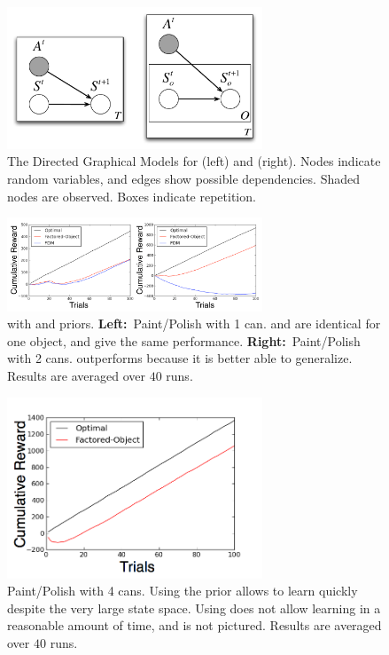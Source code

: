 \begin{figure}
\vskip 0.2in
\begin{center}
\centerline{\includegraphics[width=3in]{dgms}}
\caption{
The Directed Graphical Models for  (left) and  (right). Nodes indicate random variables, and edges show possible dependencies. Shaded nodes are observed. Boxes indicate repetition.
}
\label{fig:dgms}
\end{center}
\vskip -0.2in
\end{figure} 

\begin{figure}
\vskip 0.2in
\begin{center}
\centerline{\includegraphics[width=3in]{paint1-2can}}
\caption{
 with  and  priors. {\bf Left:}~Paint/Polish with 1 can.  and  are identical for one object, and give the same performance. {\bf Right:}~Paint/Polish with 2 cans.  outperforms  because it is better able to generalize. Results are averaged over $40$ runs.
}
\label{fig:paint1-2can}
\end{center}
\vskip -0.2in
\end{figure} 


\begin{figure}
\vskip 0.2in
\begin{center}
\centerline{\includegraphics[width=3in]{paint4can}}
\caption{
Paint/Polish with 4 cans. Using the  prior allows  to learn quickly despite the very large state space. Using  does not allow learning in a reasonable amount of time, and is not pictured. Results are averaged over $40$ runs.
}
\label{fig:paint4can}
\end{center}
\vskip -0.2in
\end{figure} 


